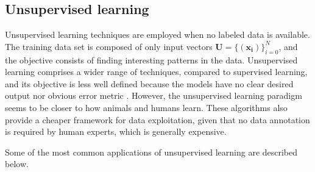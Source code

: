 \subsection{Unsupervised learning}
Unsupervised learning techniques are employed when no labeled data is available. The training data set is composed of only input vectors $\mathbf{U}=\{(\mathbf{x_i})\}_{i=0}^{N}$, and the objective consists of finding interesting patterns in the data. Unsupervised learning comprises a wider range of techniques, compared to supervised learning, and its objective is less well defined because the models have no clear desired output nor obvious error metric \autocite{Goodfellow2016}. However, the unsupervised learning paradigm seems to be closer to how animals and humans learn. These algorithms also provide a cheaper framework for data exploitation, given that no data annotation is required by human experts, which is generally expensive.

Some of the most common applications of unsupervised learning are described below.

